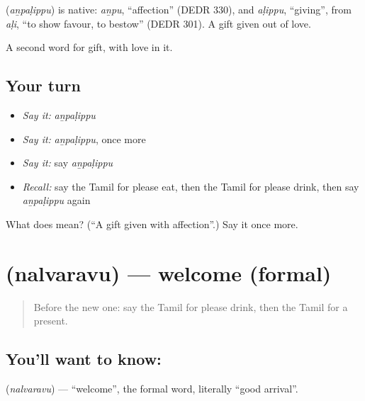 \begin{cousinweb}
\textbf{} (\emph{aṉpaḷippu}) is native: \emph{aṉpu}, \textquotedblleft{}affection\textquotedblright{} (DEDR 330), and \emph{aḷippu}, \textquotedblleft{}giving\textquotedblright{}, from \emph{aḷi}, \textquotedblleft{}to show favour, to bestow\textquotedblright{} (DEDR 301). A gift given out of love.
\end{cousinweb}

\begin{grammarlens}[title={What you've built}]
A second word for gift, with love in it.
\end{grammarlens}

\subsection*{Your turn}
\begin{itemize}
\raggedright
  \item \emph{Say it:} \emph{aṉpaḷippu}
  \item \emph{Say it:} \emph{aṉpaḷippu}, once more
  \item \emph{Say it:} say \emph{aṉpaḷippu}
  \item \emph{Recall:} say the Tamil for please eat, then the Tamil for please drink, then say \emph{aṉpaḷippu} again
\end{itemize}

\begin{tcolorbox}[breakable,colback=teal!4,colframe=teal!35!black,title={Before you move on}]
What does  mean? (\textquotedblleft{}A gift given with affection\textquotedblright{}.) Say it once more.
\end{tcolorbox}
\section[\texorpdfstring{\ta{நல்வரவு} (nalvaravu)}{நல்வரவு (nalvaravu)}]{ (nalvaravu) — welcome (formal)}

\label{lesson:TA-C99-welcomeformal}



\begin{quote}
Before the new one: say the Tamil for please drink, then the Tamil for a present.
\end{quote}

\subsection*{You'll want to know: }
\textbf{} (\emph{nalvaravu}) — \textquotedblleft{}welcome\textquotedblright{}, the formal word, literally \textquotedblleft{}good arrival\textquotedblright{}.

